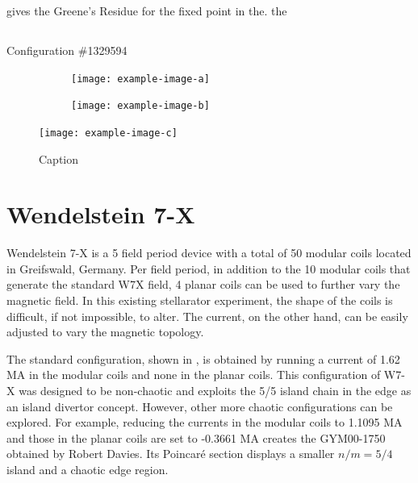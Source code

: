  gives the Greene's Residue for the fixed point in the. the

\subsection{}\label{sec:quars-1329594}

Configuration \#1329594

\begin{figure}[h!]
    \centering
    \begin{subfigure}[t]{0.49\textwidth}
        \centering
        \texttt{[image: example-image-a]}
        \caption{}
        \label{fig:}
    \end{subfigure}
    \hfill
    \begin{subfigure}[t]{0.49\textwidth}
        \centering
        \texttt{[image: example-image-b]}
        \caption{}
        \label{}
    \end{subfigure}
    \caption{}
    \label{}
\end{figure}

\begin{figure}[H]
    \centering
    \texttt{[image: example-image-c]}
    \caption{Caption}
    \label{fig:enter-label}
\end{figure}


\section{Wendelstein 7-X}\label{sec:w7x}

Wendelstein 7-X is a 5 field period device with a total of 50 modular coils located in Greifswald, Germany. Per field period, in addition to the 10 modular coils that generate the standard W7X field, 4 planar coils can be used to further vary the magnetic field. In this existing stellarator experiment, the shape of the coils is difficult, if not impossible, to alter. The current, on the other hand, can be easily adjusted to vary the magnetic topology.

The standard configuration, shown in , is obtained by running a current of 1.62 MA in the modular coils and none in the planar coils. This configuration of W7-X was designed to be non-chaotic and exploits the 5/5 island chain in the edge as an island divertor concept. However, other more chaotic configurations can be explored. For example, reducing the currents in the modular coils to 1.1095 MA and those in the planar coils are set to -0.3661 MA creates the GYM00-1750 obtained by Robert Davies. Its Poincar\'e section  displays a smaller $n/m = 5/4$ island and a chaotic edge region.

